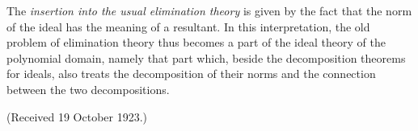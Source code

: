 The \emph{insertion into the usual elimination theory} is given by the fact that the norm of the ideal has the meaning of a resultant. In this interpretation, the old problem of elimination theory thus becomes a part of the ideal theory of the polynomial domain, namely that part which, beside the decomposition theorems for ideals, also treats the decomposition of their norms and the connection between the two decompositions.

\begin{center}
(Received 19 October 1923.)
\end{center}
